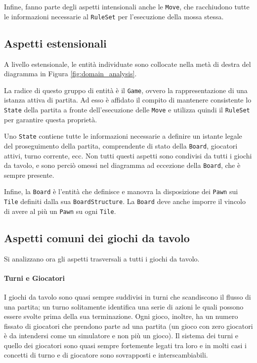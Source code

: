 Infine, fanno parte degli aspetti intensionali anche le \texttt{Move}, che racchiudono tutte le informazioni necessarie al \texttt{RuleSet} per l'esecuzione della mossa stessa.

\subsection{Aspetti estensionali}
A livello estensionale, le entità individuate sono collocate nella metà di destra del diagramma in Figura \ref{fig:domain_analysis}.

La radice di questo gruppo di entità è il \texttt{Game}, ovvero la rappresentazione di una istanza attiva di partita.
%
Ad esso è affidato il compito di mantenere consistente lo \texttt{State} della partita a fronte dell'esecuzione delle \texttt{Move} e utilizza quindi il \texttt{RuleSet} per garantire questa proprietà.

Uno \texttt{State} contiene tutte le informazioni necessarie a definire un istante legale del proseguimento della partita, comprendente di stato della \texttt{Board}, giocatori attivi, turno corrente, ecc.
%
Non tutti questi aspetti sono condivisi da tutti i giochi da tavolo, e sono perciò omessi nel diagramma ad eccezione della \texttt{Board}, che è sempre presente.

Infine, la \texttt{Board} è l'entità che definisce e manovra la disposizione dei \texttt{Pawn} sui \texttt{Tile} definiti dalla sua \texttt{BoardStructure}.
%
La \texttt{Board} deve anche imporre il vincolo di avere al più un \texttt{Pawn} su ogni \texttt{Tile}.

\subsection{Aspetti comuni dei giochi da tavolo}
%
Si analizzano ora gli aspetti trasversali a tutti i giochi da tavolo.
%
\paragraph{Turni e Giocatori}
%
I giochi da tavolo sono quasi sempre suddivisi in turni che scandiscono il flusso di una partita; un turno solitamente identifica una serie di azioni le quali possono essere svolte prima della sua terminazione.
%
Ogni gioco, inoltre, ha un numero fissato di giocatori che prendono parte ad una partita (un gioco con zero giocatori è da intendersi come un simulatore e non più un gioco).
%
Il sistema dei turni e quello dei giocatori sono quasi sempre fortemente legati tra loro e in molti casi i concetti di turno e di giocatore sono sovrapposti e interscambiabili.
%

